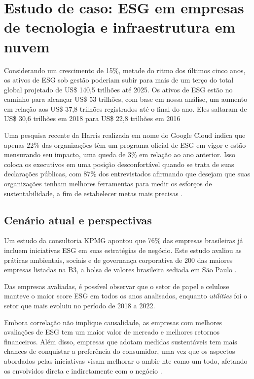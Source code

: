 \documentclass[12pt]{article}
\begin{document}
	\section*{Estudo de caso: ESG em empresas de tecnologia e infraestrutura em nuvem}
	
	Considerando um crescimento de 15\%, metade do ritmo dos últimos cinco anos, os ativos de ESG sob gestão poderiam subir para mais de um terço do total global projetado de US\$ 140,5 trilhões até 2025. Os ativos de ESG estão no caminho para alcançar US\$ 53 trilhões, com base em nossa análise, um aumento em relação aos US\$ 37,8 trilhões registrados até o final do ano. Eles saltaram de US\$ 30,6 trilhões em 2018 para US\$ 22,8 trilhões em 2016 \cite{bloombergprofessionalservicesESGAssetsMay2021}
	
	Uma pesquisa recente da Harris realizada em nome do Google Cloud indica que apenas 22\% das organizações têm um programa oficial de ESG em vigor e estão mensurando seu impacto, uma queda de 3\% em relação ao ano anterior. Isso coloca os executivos em uma posição desconfortável quando se trata de suas declarações públicas, com 87\% dos entrevistados afirmando que desejam que suas organizações tenham melhores ferramentas para medir os esforços de sustentabilidade, a fim de estabelecer metas mais precisas \cite{googlecloudUnderstandingHowYour2023}.
	
	\subsection*{Cenário atual e perspectivas}
	
	Um estudo da consultoria KPMG apontou que 76\% das empresas brasileiras já incluem iniciativas ESG em suas estratégias de negócio. Este estudo avaliou as práticas ambientais, sociais e de governança corporativa de 200 das maiores empresas listadas na B3, a bolsa de valores brasileira sediada em São Paulo \cite{deKPMGESGYearbook2023}.
	
	Das empresas avaliadas, é possível observar que o setor de papel e celulose manteve o maior score ESG em todos os anos analisados, enquanto \emph{utilities} foi o setor que mais evoluiu no período de 2018 a 2022.
	

	
	Embora correlação não implique causalidade, as empresas com melhores avaliações de ESG tem um maior valor de mercado e melhores retornos financeiros. Além disso, empresas que adotam medidas sustentáveis tem mais chances de conquistar a preferência do consumidor, uma vez que os aspectos abordados pelas iniciativas visam melhorar o ambie nte como um todo, afetando os envolvidos direta e indiretamente com o negócio \cite{cabralPraticasESGAplicadas2023}.
	
\end{document}
